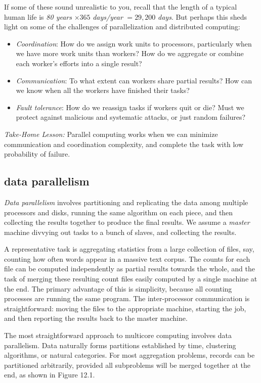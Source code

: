 \documentclass[10pt]{article}
\begin{document}
\begin{enumerate}
If some of these sound unrealistic to you, recall that the length of a typical human life is \textit{80 years} $\times 365$ \textit{days/year} $= 29,200$ \textit{days}. But perhaps this sheds light on some of the challenges of parallelization and distributed computing:

\begin{itemize}
  \item \textit{Coordination}: How do we assign work units to processors, particularly when we have more work units than workers? How do we aggregate or combine each worker's efforts into a single result?
  \item \textit{Communication}: To what extent can workers share partial results? How can we know when all the workers have finished their tasks?
  \item \textit{Fault tolerance}: How do we reassign tasks if workers quit or die? Must we protect against malicious and systematic attacks, or just random failures?
\end{itemize}

\textit{Take-Home Lesson:} Parallel computing works when we can minimize communication and coordination complexity, and complete the task with low probability of failure.

\subsection*{data parallelism}
\textit{Data parallelism} involves partitioning and replicating the data among multiple processors and disks, running the same algorithm on each piece, and then collecting the results together to produce the final results. We assume a \textit{master} machine divvying out tasks to a bunch of slaves, and collecting the results.

A representative task is aggregating statistics from a large collection of files, say, counting how often words appear in a massive text corpus. The counts for each file can be computed independently as partial results towards the whole, and the task of merging these resulting count files easily computed by a single machine at the end. The primary advantage of this is simplicity, because all counting processes are running the same program. The inter-processor communication is straightforward: moving the files to the appropriate machine, starting the job, and then reporting the results back to the master machine.

The most straightforward approach to multicore computing involves data parallelism. Data naturally forms partitions established by time, clustering algorithms, or natural categories. For most aggregation problems, records can be partitioned arbitrarily, provided all subproblems will be merged together at the end, as shown in Figure 12.1.


\end{enumerate}
\end{document}
